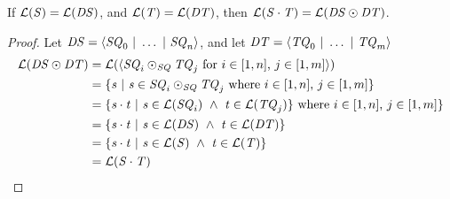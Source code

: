 \documentclass[acmsmall,screen,anonymous]{acmart}
\begin{document}
\begin{mylemma}
  \label{lem:cdnfeq}
  If $\mathcal{L}(\mathit{S})=\mathcal{L}(\mathit{DS})$,
  and $\mathcal{L}(\mathit{T})=\mathcal{L}(\mathit{DT})$,
  then $\mathcal{L}(\mathit{S}\cdot\mathit{T})=
  \mathcal{L}(\mathit{DS}\odot\mathit{DT})$.
\end{mylemma}
\begin{proof}
  Let $\mathit{DS}=\langle\mathit{SQ}_0~|~\ldots~|~\mathit{SQ}_n\rangle$, and
  let $\mathit{DT}=\langle\mathit{TQ}_0~|~\ldots~|~\mathit{TQ}_m\rangle$
  \begin{align*}
    \mathcal{L}(\mathit{DS}\odot\mathit{DT}) & = 
                                                         \mathcal{L}(\langle\mathit{SQ}_i\odot_{\mathit{SQ}}\mathit{TQ}_j
                                                         \text{ for $i\in[1,n]$, $j\in[1,m]$}\rangle) \\
                                                       & = 
                                                         \{\mathit{s}~|~ \mathit{s}\in\mathit{SQ}_i\odot_{\mathit{SQ}}\mathit{TQ}_j \text{ where $i\in[1,n]$, $j\in[1,m]$}\}\\
                                                       & = 
                                                         \{\mathit{s}\cdot\mathit{t}{} ~|~{} \mathit{s}\in\mathcal{L}(\mathit{SQ}_i)
                                                         ~\wedge~{} \mathit{t}\in\mathcal{L}(\mathit{TQ}_j)\} \text{ where $i\in[1,n]$, $j\in[1,m]$}\}\\
                                                       & =
                                                         \{\mathit{s}\cdot\mathit{t}{} ~|~{} \mathit{s}\in\mathcal{L}(\mathit{DS})
                                                         ~\wedge~{} \mathit{t}\in\mathcal{L}(\mathit{DT})\}\\
                                                       & =
                                                         \{\mathit{s}\cdot\mathit{t}{} ~|~{} \mathit{s}\in\mathcal{L}(\mathit{S})
                                                         ~\wedge~{} \mathit{t}\in\mathcal{L}(\mathit{T})\}\\
                                                       & =
                                                         \mathcal{L}(\mathit{S}\cdot\mathit{T})
\end{align*}
\end{proof}
\end{document}
